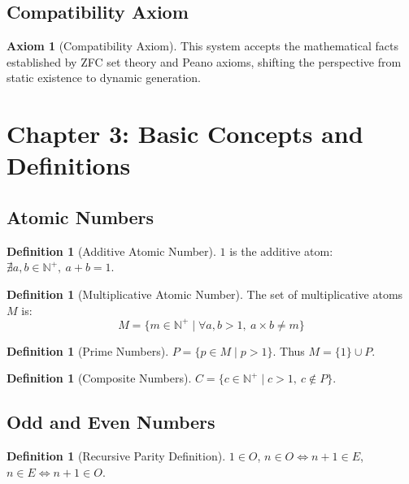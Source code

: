 \documentclass[12pt]{article}
\theoremstyle{definition}
\newtheorem{definition}[theorem]{Definition}
\newtheorem{axiom}[theorem]{Axiom}
\newcommand{\N}{\mathbb{N}}
\begin{document}
\subsection{Compatibility Axiom}

\begin{axiom}[Compatibility Axiom]
This system accepts the mathematical facts established by ZFC set theory and Peano axioms, shifting the perspective from static existence to dynamic generation.
\end{axiom}

\section{Chapter 3: Basic Concepts and Definitions}

\subsection{Atomic Numbers}

\begin{definition}[Additive Atomic Number]
\(1\) is the additive atom: \(\nexists a,b \in \N^+,\ a+b = 1\).
\end{definition}

\begin{definition}[Multiplicative Atomic Number]
The set of multiplicative atoms \(M\) is:
\[
M = \{m \in \N^+ \mid \forall a,b > 1,\ a \times b \neq m\}
\]
\end{definition}

\begin{definition}[Prime Numbers]
\(P = \{p \in M \mid p > 1\}\). Thus \(M = \{1\} \cup P\).
\end{definition}

\begin{definition}[Composite Numbers]
\(C = \{c \in \N^+ \mid c > 1,\ c \notin P\}\).
\end{definition}

\subsection{Odd and Even Numbers}

\begin{definition}[Recursive Parity Definition]
\(1 \in O\), \(n \in O \iff n+1 \in E\), \(n \in E \iff n+1 \in O\).
\end{definition}
\end{document}
